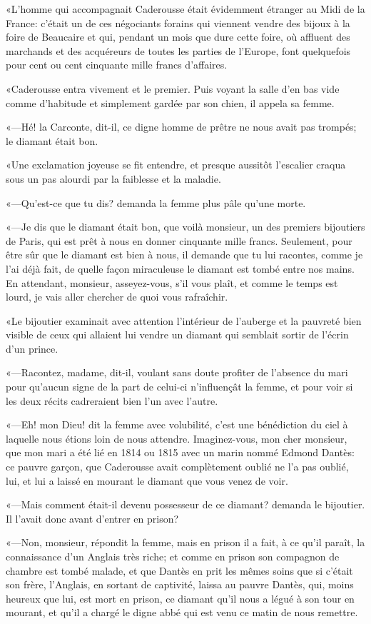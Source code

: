 «L'homme qui accompagnait Caderousse était évidemment étranger au Midi de la France: c'était un de ces négociants forains qui viennent vendre des bijoux à la foire de Beaucaire et qui, pendant un mois que dure cette foire, où affluent des marchands et des acquéreurs de toutes les parties de l'Europe, font quelquefois pour cent ou cent cinquante mille francs d'affaires. 

«Caderousse entra vivement et le premier. Puis voyant la salle d'en bas vide comme d'habitude et simplement gardée par son chien, il appela sa femme. 

«—Hé! la Carconte, dit-il, ce digne homme de prêtre ne nous avait pas trompés; le diamant était bon. 

«Une exclamation joyeuse se fit entendre, et presque aussitôt l'escalier craqua sous un pas alourdi par la faiblesse et la maladie. 

«—Qu'est-ce que tu dis? demanda la femme plus pâle qu'une morte. 

«—Je dis que le diamant était bon, que voilà monsieur, un des premiers bijoutiers de Paris, qui est prêt à nous en donner cinquante mille francs. Seulement, pour être sûr que le diamant est bien à nous, il demande que tu lui racontes, comme je l'ai déjà fait, de quelle façon miraculeuse le diamant est tombé entre nos mains. En attendant, monsieur, asseyez-vous, s'il vous plaît, et comme le temps est lourd, je vais aller chercher de quoi vous rafraîchir. 

«Le bijoutier examinait avec attention l'intérieur de l'auberge et la pauvreté bien visible de ceux qui allaient lui vendre un diamant qui semblait sortir de l'écrin d'un prince. 

«—Racontez, madame, dit-il, voulant sans doute profiter de l'absence du mari pour qu'aucun signe de la part de celui-ci n'influençât la femme, et pour voir si les deux récits cadreraient bien l'un avec l'autre. 

«—Eh! mon Dieu! dit la femme avec volubilité, c'est une bénédiction du ciel à laquelle nous étions loin de nous attendre. Imaginez-vous, mon cher monsieur, que mon mari a été lié en 1814 ou 1815 avec un marin nommé Edmond Dantès: ce pauvre garçon, que Caderousse avait complètement oublié ne l'a pas oublié, lui, et lui a laissé en mourant le diamant que vous venez de voir. 

«—Mais comment était-il devenu possesseur de ce diamant? demanda le bijoutier. Il l'avait donc avant d'entrer en prison?  

«—Non, monsieur, répondit la femme, mais en prison il a fait, à ce qu'il paraît, la connaissance d'un Anglais très riche; et comme en prison son compagnon de chambre est tombé malade, et que Dantès en prit les mêmes soins que si c'était son frère, l'Anglais, en sortant de captivité, laissa au pauvre Dantès, qui, moins heureux que lui, est mort en prison, ce diamant qu'il nous a légué à son tour en mourant, et qu'il a chargé le digne abbé qui est venu ce matin de nous remettre. 

